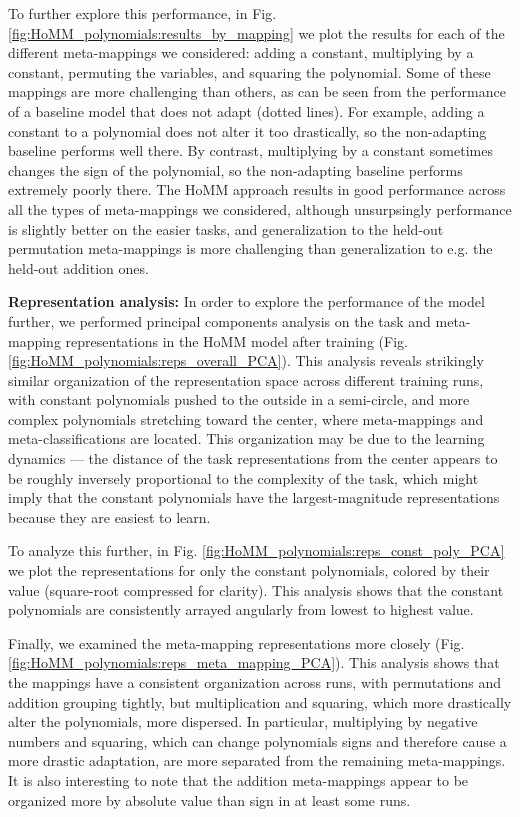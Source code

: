 To further explore this performance, in Fig. \ref{fig:HoMM_polynomials:results_by_mapping} we plot the results for each of the different meta-mappings we considered: adding a constant, multiplying by a constant, permuting the variables, and squaring the polynomial. Some of these mappings are more challenging than others, as can be seen from the performance of a baseline model that does not adapt (dotted lines). For example, adding a constant to a polynomial does not alter it too drastically, so the non-adapting baseline performs well there. By contrast, multiplying by a constant sometimes changes the sign of the polynomial, so the non-adapting baseline performs extremely poorly there. The HoMM approach results in good performance across all the types of meta-mappings we considered, although unsurpsingly performance is slightly better on the easier tasks, and generalization to the held-out permutation meta-mappings is more challenging than generalization to e.g. the held-out addition ones. 

\textbf{Representation analysis:} In order to explore the performance of the model further, we performed principal components analysis on the task and meta-mapping representations in the HoMM model after training (Fig. \ref{fig:HoMM_polynomials:reps_overall_PCA}). This analysis reveals strikingly similar organization of the representation space across different training runs, with constant polynomials pushed to the outside in a semi-circle, and more complex polynomials stretching toward the center, where meta-mappings and meta-classifications are located. This organization may be due to the learning dynamics --- the distance of the task representations from the center appears to be roughly inversely proportional to the complexity of the task, which might imply that the constant polynomials have the largest-magnitude representations because they are easiest to learn. 

To analyze this further, in Fig. \ref{fig:HoMM_polynomials:reps_const_poly_PCA} we plot the representations for only the constant polynomials, colored by their value (square-root compressed for clarity). This analysis shows that the constant polynomials are consistently arrayed angularly from lowest to highest value.

Finally, we examined the meta-mapping representations more closely (Fig. \ref{fig:HoMM_polynomials:reps_meta_mapping_PCA}). This analysis shows that the mappings have a consistent organization across runs, with permutations and addition grouping tightly, but multiplication and squaring, which more drastically alter the polynomials, more dispersed. In particular, multiplying by negative numbers and squaring, which can change polynomials signs and therefore cause a more drastic adaptation, are more separated from the remaining meta-mappings. It is also interesting to note that the addition meta-mappings appear to be organized more by absolute value than sign in at least some runs. 

